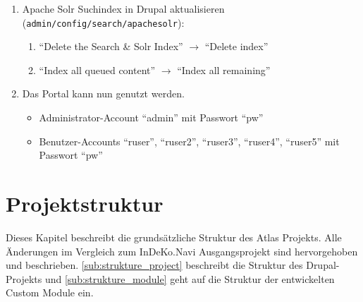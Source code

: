 \begin{enumerate}
	\item Apache Solr Suchindex in Drupal aktualisieren (\lstinline|admin/config/search/apachesolr|):
	\begin{enumerate}
		\item \enquote{Delete the Search \& Solr Index} $\rightarrow$ \enquote{Delete index}
		
		\item \enquote{Index all queued content}  $\rightarrow$ \enquote{Index all remaining}  
	\end{enumerate}
	
	\item Das Portal kann nun genutzt werden.
	\begin{itemize}
		\item Administrator-Account \enquote{admin} mit Passwort \enquote{pw}
		\item Benutzer-Accounts \enquote{ruser}, \enquote{ruser2}, \enquote{ruser3}, \enquote{ruser4}, \enquote{ruser5}  mit Passwort \enquote{pw}
	\end{itemize}
\end{enumerate}



\section{Projektstruktur}
Dieses Kapitel beschreibt die grundsätzliche Struktur des Atlas Projekts. Alle Änderungen im Vergleich zum InDeKo.Navi Ausgangsprojekt sind hervorgehoben und beschrieben. \cref{sub:strukture_project} beschreibt die Struktur des Drupal-Projekts und \cref{sub:strukture_module} geht auf die Struktur der entwickelten Custom Module ein.


